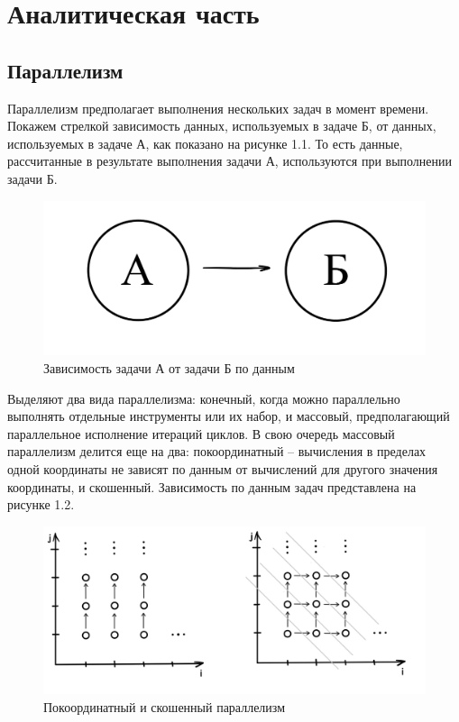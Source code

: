 \chapter{Аналитическая часть}

\section{Параллелизм}
Параллелизм предполагает выполнения нескольких задач в момент времени. Покажем стрелкой зависимость данных, используемых в задаче Б, от данных, используемых в задаче А, как показано на рисунке 1.1. То есть данные, рассчитанные в результате выполнения задачи А, используются при выполнении задачи Б. 

\begin{figure}[h!]
	\centering
	\includegraphics[scale=0.4]{img/Связь.png}
	\caption{Зависимость задачи А от задачи Б по данным}
	\label{fig:mpr}
\end{figure}

Выделяют два вида параллелизма: конечный, когда можно параллельно выполнять отдельные инструменты или их набор, и массовый, предполагающий параллельное исполнение итераций циклов. В свою очередь массовый параллелизм делится еще на два: покоординатный -- вычисления в пределах одной координаты не зависят по данным от вычислений для другого значения координаты, и скошенный. Зависимость по данным задач представлена на рисунке 1.2. 

\begin{figure}[h!]
	\centering
	\includegraphics[scale=0.9]{img/Параллелизм.png}
	\caption{Покоординатный и скошенный параллелизм}
	\label{fig:mpr}
\end{figure}

